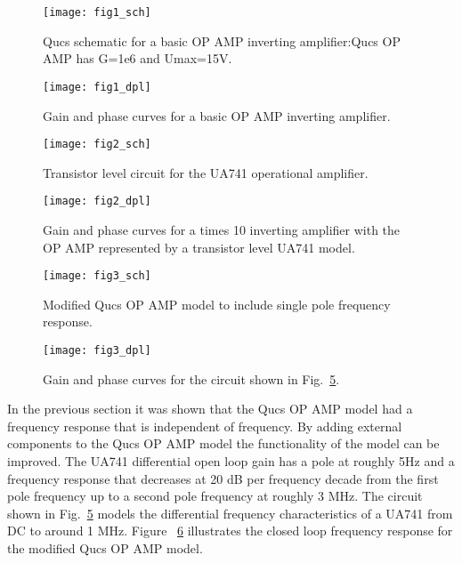 \begin{figure}
  \centering
  \texttt{[image: fig1\_sch]}
  \caption{Qucs schematic for a basic OP AMP inverting amplifier:Qucs OP AMP has G=1e6 and Umax=15V.}
  \label{fig:opamp1}
\end{figure} 

\begin{figure}
  \centering
  \texttt{[image: fig1\_dpl]}
  \caption{Gain and phase curves for a basic OP AMP inverting amplifier.}
  \label{fig:opamp2}
\end{figure} 

\begin{figure}
  \centering
  \texttt{[image: fig2\_sch]}
  \caption{Transistor level circuit for the UA741 operational amplifier.}
  \label{fig:opamp3}
\end{figure} 


\begin{figure}
  \centering
  \texttt{[image: fig2\_dpl]}
  \caption{Gain and phase curves for a times 10 inverting amplifier with the OP AMP represented by a transistor level UA741 model.}
  \label{fig:opamp4}
\end{figure} 


\begin{figure}
  \centering
  \texttt{[image: fig3\_sch]}
  \caption{Modified Qucs OP AMP model to include single pole frequency response.}
  \label{fig:opamp5}
\end{figure} 

\begin{figure}
  \centering
  \texttt{[image: fig3\_dpl]}
  \caption{Gain and phase curves for the circuit shown in Fig.~\ref{fig:opamp5}.}
  \label{fig:opamp6}
\end{figure} 


In the previous section it was shown that the Qucs OP AMP model had a frequency response that is independent of frequency.  By adding external components to the Qucs OP AMP model the functionality of the model can be improved.  The UA741 differential open loop gain has a pole at roughly 5Hz and a frequency response that decreases at 20 dB per frequency decade from the first pole frequency up to a second pole frequency at roughly 3 MHz. The circuit shown in Fig.~\ref{fig:opamp5} models the differential frequency characteristics of a UA741 from DC to around 1 MHz. Figure ~\ref{fig:opamp6} illustrates the closed loop frequency response for the modified Qucs OP AMP model.



